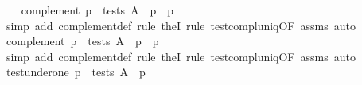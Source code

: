 \begin{isabellebody}
\endisatagproof
{\isafoldproof}%
%
\isadelimproof
\isanewline
%
\endisadelimproof
\isanewline
\ \ \isamarkupfalse%
\ complement{}{}\ {}p\ {}\ tests\ A\ {}\ p\ {}\ {}p\ {}\ {}{}\isanewline
%
\isadelimproof
\ \ \ \ %
\endisadelimproof
%
\isatagproof
{}\isamarkupfalse%
\ {}simp\ add{}\ complement{}def{}\ rule\ the{}I{}{}\ rule\ test{}compl{}uniq{}OF\ assms{}{}\ auto{}{}%
\endisatagproof
{\isafoldproof}%
%
\isadelimproof
\isanewline
%
\endisadelimproof
\isanewline
\ \ \isamarkupfalse%
\ complement{}{}\ {}p\ {}\ tests\ A\ {}\ p\ {}\ {}p\ {}\ {}{}\isanewline
%
\isadelimproof
\ \ \ \ %
\endisadelimproof
%
\isatagproof
{}\isamarkupfalse%
\ {}simp\ add{}\ complement{}def{}\ rule\ the{}I{}{}\ rule\ test{}compl{}uniq{}OF\ assms{}{}\ auto{}{}%
\endisatagproof
{\isafoldproof}%
%
\isadelimproof
\isanewline
%
\endisadelimproof
\isanewline
\ \ \isamarkupfalse%
\ test{}under{}one{}\ {}p\ {}\ tests\ A\ {}\ p\ {}\ {}{}\isanewline

\end{isabellebody}
